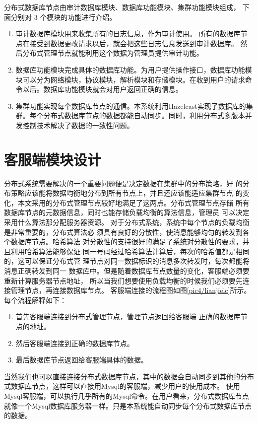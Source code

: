 分布式数据库节点由审计数据库模块、数据库功能模块、集群功能模块组成，
 下面分别对 3 个模块的功能进行介绍。
 \begin{enumerate}
 	\item 审计数据库模块用来收集所有的日志信息，作为审计使用。
 	所有的数据库节点在接受到数据更改请求以后，就会把这些日志信息发送到审计数据库。
 	然后分布式管理节点就能利用这个数据为管理员提供审计功能。
 	\item 数据库功能模块完成具体的数据库功能。为用户提供操作接口，数据库功能模块可以分为网络模块，协议模块，解析模块和存储模块。在收到用户的请求命令以后。数据库功能模块就会对用户返回正确的信息。
 	\item 集群功能实现每个数据库节点的通信。本系统利用Hazelcast实现了数据库的集群。每个分布式数据库节点的数据都能自动同步。同时，利用分布式多版本并发控制技术解决了数据的一致性问题。
 \end{enumerate}
\section{客服端模块设计}
分布式系统需要解决的一个重要问题便是决定数据在集群中的分布策略，好
的分布策略应该能将数据均衡地分布到所有节点上，并且还应该能适应集群节点
的变化，本文采用的分布式管理节点较好地满足了这两点。分布式管理节点存储
所有数据库节点的元数据信息，同时也能存储负载均衡的算法信息，管理员
可以决定采用什么算法那分配服务器资源。
对于分布式系统，系统中每个节点的负载均衡是非常重要的，分布式算法必
须具有良好的分散性，使消息能够均匀的转发到各个数据库节点。哈希算法
对分散性的支持很好的满足了系统对分散性的要求，并且利用哈希算法能够保证
同一号码经过哈希算法计算后，每次的哈希值都是相同的，这可以保证分布式管
理节点对同一数据标识的消息多次转发时，每次都能将消息正确转发到同一
数据库中。但是随着数据库节点数量的变化，客服端必须要重新计算服务器节点地址，
所以当我们想要使用负载均衡的时候我们必须要先连接管理节点，再连接数据库节点。
客服端连接的流程图如图\ref{pic4/lianjielc}所示。
每个流程解释如下：
\begin{enumerate}
	\item 首先客服端连接到分布式管理节点，管理节点返回给客服端
	正确的数据库节点的地址。
	\item 然后客服端连接到正确的数据库节点。
	\item 最后数据库节点返回给客服端具体的数据。
\end{enumerate}
当然我们也可以直接连接分布式数据库节点，其中的数据会自动同步到其他的分布式数据库节点，这样可以直接用Mysql的客服端，减少用户的使用成本。
使用Mysql客服端，可以执行几乎所有的Mysql命令。在用户看来，分布式数据库节点就像一个Mysql数据库服务器一样。只是本系统能自动同步每个分布式数据库节点的数据。
